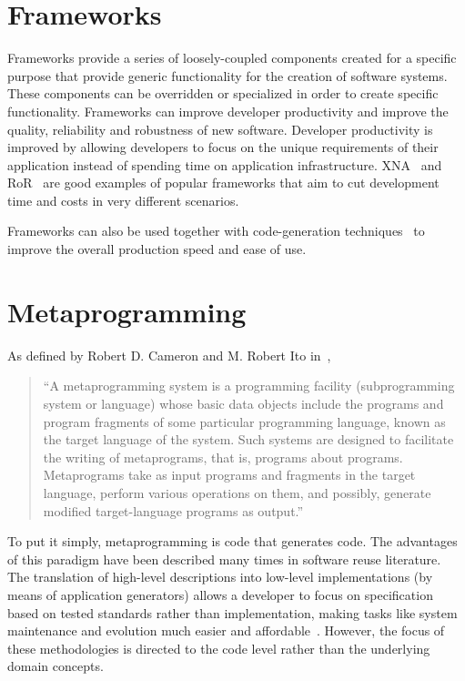 \section{Frameworks}\label{sec:frameworks}

Frameworks provide a series of loosely-coupled components created for a specific purpose that provide generic functionality for the creation of software systems. These components can be overridden or specialized in order to create specific functionality. Frameworks can improve developer productivity and improve the quality, reliability and robustness of new software.  Developer productivity is improved by allowing developers to focus on the unique requirements of their application instead of spending time on application infrastructure. XNA~\cite{xna} and RoR~\cite{rubyonrails} are good examples of popular frameworks that aim to cut development time and costs in very different scenarios.

Frameworks can also be used together with code-generation techniques~\cite{DH04, rails_generators} to improve the overall production speed and ease of use.

\section{Metaprogramming}\label{sec:metaprogramming}

As defined by Robert D. Cameron and M. Robert Ito in~\cite{CI84},

\begin{quote}
 ``A metaprogramming system is a programming facility (subprogramming system or language) whose basic data objects include the programs and program fragments of some particular programming language, known as the target language of the system. Such systems are designed to facilitate the writing of metaprograms, that is, programs about programs. Metaprograms take as input programs and fragments in the target language, perform various operations on them, and possibly, generate modified target-language programs as output.''
\end{quote}

To put it simply, metaprogramming is code that generates code. The advantages of this paradigm have been described many times in software reuse literature. The translation of high-level descriptions into low-level implementations (by means of application generators) allows a developer to focus on specification based on tested standards rather than implementation, making tasks like system maintenance and evolution much easier and affordable~\cite{Bas87, Cle88}. However, the focus of these methodologies is directed to the code level rather than the underlying domain concepts.

